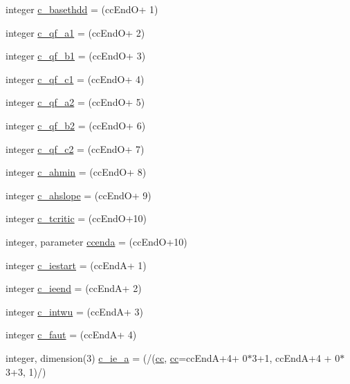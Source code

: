 \begin{DoxyCompactItemize}
\item 
integer \hyperlink{namespaceallocatearray_aa77a8cbacfed015c662b9225f95325cf}{c\+\_\+basethdd} = (cc\+EndO+ 1)
\item 
integer \hyperlink{namespaceallocatearray_af23df58aebe7b1273ec66a6e9f9a3310}{c\+\_\+qf\+\_\+a1} = (cc\+EndO+ 2)
\item 
integer \hyperlink{namespaceallocatearray_a5dac1791d2320a56ba97265778353290}{c\+\_\+qf\+\_\+b1} = (cc\+EndO+ 3)
\item 
integer \hyperlink{namespaceallocatearray_a17cce5e7c3e285684d0237da33d9147d}{c\+\_\+qf\+\_\+c1} = (cc\+EndO+ 4)
\item 
integer \hyperlink{namespaceallocatearray_a447c1747b013dfc70d3428e9decd1118}{c\+\_\+qf\+\_\+a2} = (cc\+EndO+ 5)
\item 
integer \hyperlink{namespaceallocatearray_a2ce50744f82721acb57ca92da1352f3d}{c\+\_\+qf\+\_\+b2} = (cc\+EndO+ 6)
\item 
integer \hyperlink{namespaceallocatearray_a8e5d39962fa81f4e9eeb4c4e8d80b5c7}{c\+\_\+qf\+\_\+c2} = (cc\+EndO+ 7)
\item 
integer \hyperlink{namespaceallocatearray_ae9a2fabfb3c96a65abc7658a20cc96e4}{c\+\_\+ahmin} = (cc\+EndO+ 8)
\item 
integer \hyperlink{namespaceallocatearray_a7ec4c5b36ffc6e561a665ed0610bcfdc}{c\+\_\+ahslope} = (cc\+EndO+ 9)
\item 
integer \hyperlink{namespaceallocatearray_abe5ad402b720ef5716ceb8120aca3611}{c\+\_\+tcritic} = (cc\+EndO+10)
\item 
integer, parameter \hyperlink{namespaceallocatearray_a46bae68e8ba9e3b02713186773f60f5c}{ccenda} = (cc\+EndO+10)
\item 
integer \hyperlink{namespaceallocatearray_a843f1c5df3eceab017e76237dbd6f89f}{c\+\_\+iestart} = (cc\+EndA+ 1)
\item 
integer \hyperlink{namespaceallocatearray_aac513d5c2f6bd570ee8ece0bd5d55d11}{c\+\_\+ieend} = (cc\+EndA+ 2)
\item 
integer \hyperlink{namespaceallocatearray_a924d021792ec209f52debd87b3b234f7}{c\+\_\+intwu} = (cc\+EndA+ 3)
\item 
integer \hyperlink{namespaceallocatearray_afe130fb4e5703304158597061af686f9}{c\+\_\+faut} = (cc\+EndA+ 4)
\item 
integer, dimension(3) \hyperlink{namespaceallocatearray_a1c539078b4e93d885bf9e49a3908c552}{c\+\_\+ie\+\_\+a} = (/(\hyperlink{namespaceallocatearray_ac863c81704eb507dee10f5e10741e10c}{cc}, \hyperlink{namespaceallocatearray_ac863c81704eb507dee10f5e10741e10c}{cc}=cc\+EndA+4+ 0$\ast$3+1, cc\+EndA+4 + 0$\ast$3+3, 1)/)

\end{DoxyCompactItemize}
